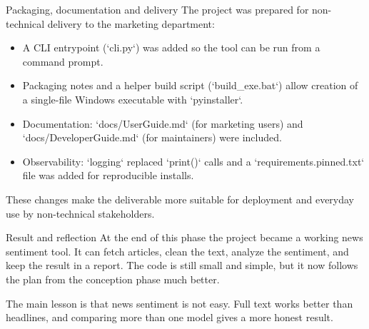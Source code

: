 \documentclass[aspectratio=169]{beamer}
\begin{document}
\begin{frame}{Packaging, documentation and delivery}
The project was prepared for non-technical delivery to the marketing department:
\begin{itemize}
    \item A CLI entrypoint (`cli.py`) was added so the tool can be run from a command prompt.
    \item Packaging notes and a helper build script (`build_exe.bat`) allow creation of a single-file Windows executable with `pyinstaller`.
    \item Documentation: `docs/UserGuide.md` (for marketing users) and `docs/DeveloperGuide.md` (for maintainers) were included.
    \item Observability: `logging` replaced `print()` calls and a `requirements.pinned.txt` file was added for reproducible installs.
\end{itemize}
These changes make the deliverable more suitable for deployment and everyday use by non-technical stakeholders.
\end{frame}

\begin{frame}{Result and reflection}
At the end of this phase the project became a working news sentiment tool. It can fetch articles, clean the text, analyze the sentiment, and keep the result in a report. The code is still small and simple, but it now follows the plan from the conception phase much better.

\vspace{2mm}
The main lesson is that news sentiment is not easy. Full text works better than headlines, and comparing more than one model gives a more honest result.
\end{frame}
\end{document}
